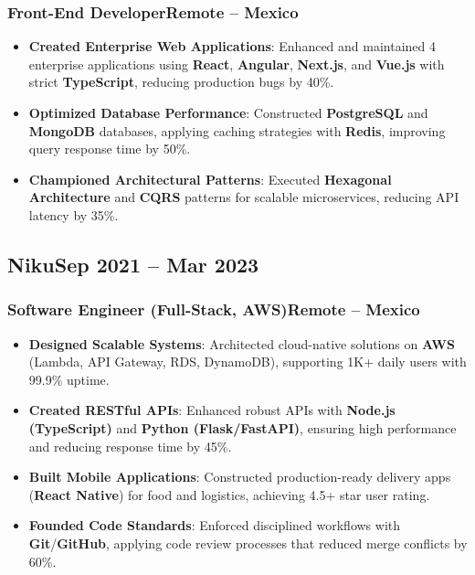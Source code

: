 \documentclass[a4paper,10pt]{article}
\newcommand{\kw}[1]{\textbf{\textcolor{keyword}{#1}}}
\newcommand{\tech}[1]{\textbf{\textcolor{tech}{#1}}}
\begin{document}
\subsubsection*{\small Front-End Developer\hfill Remote -- Mexico}
\begin{itemize}[noitemsep, leftmargin=*]
    \item \textbf{Created Enterprise Web Applications}: Enhanced and maintained 4 enterprise applications using \tech{React}, \tech{Angular}, \tech{Next.js}, and \tech{Vue.js} with strict \tech{TypeScript}, reducing production bugs by 40\%.
    \item \textbf{Optimized Database Performance}: Constructed \kw{PostgreSQL} and \kw{MongoDB} databases, applying caching strategies with \tech{Redis}, improving query response time by 50\%.
    \item \textbf{Championed Architectural Patterns}: Executed \kw{Hexagonal Architecture} and \kw{CQRS} patterns for scalable microservices, reducing API latency by 35\%.
\end{itemize}

\subsection*{\small Niku\hfill\textbf{Sep 2021 -- Mar 2023}}
\subsubsection*{\small Software Engineer (Full-Stack, AWS)\hfill Remote -- Mexico}
\begin{itemize}[noitemsep, leftmargin=*]
    \item \textbf{Designed Scalable Systems}: Architected cloud-native solutions on \tech{AWS} (Lambda, API Gateway, RDS, DynamoDB), supporting 1K+ daily users with 99.9\% uptime.
    \item \textbf{Created RESTful APIs}: Enhanced robust APIs with \tech{Node.js (TypeScript)} and \tech{Python (Flask/FastAPI)}, ensuring high performance and reducing response time by 45\%.
    \item \textbf{Built Mobile Applications}: Constructed production-ready delivery apps (\tech{React Native}) for food and logistics, achieving 4.5+ star user rating.
    \item \textbf{Founded Code Standards}: Enforced disciplined workflows with \tech{Git}/\tech{GitHub}, applying code review processes that reduced merge conflicts by 60\%.
\end{itemize}
\end{document}
